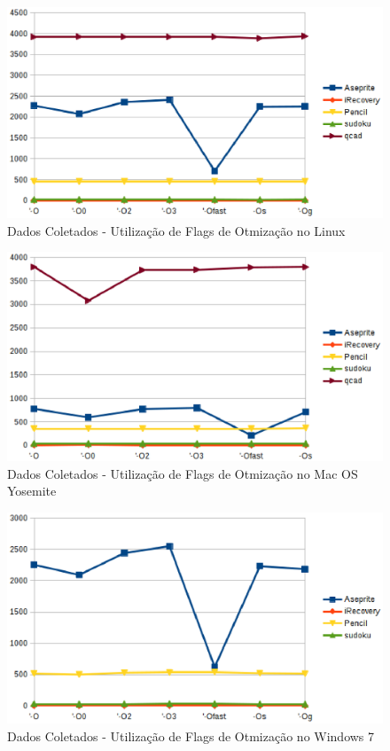         
\begin{figure}[!h]
    \centering
        \includegraphics{figuras/graficos/linux_otimizacao.eps}
    \caption{Dados Coletados - Utilização de Flags de Otmização no Linux}
    \label{flags_de_otimizacao_linux}
\end{figure}

\begin{figure}[!h]
    \centering
        \includegraphics{figuras/graficos/mac_os_otimizacao.eps}
    \caption{Dados Coletados - Utilização de Flags de Otmização no Mac OS Yosemite}
    \label{flags_de_otimizacao_mac_os}
\end{figure}


\begin{figure}[!h]
    \centering
        \includegraphics{figuras/graficos/windows_otimizacao.eps}
    \caption{Dados Coletados - Utilização de Flags de Otmização no Windows 7}
    \label{flags_de_otimizacao_windows}
\end{figure}

